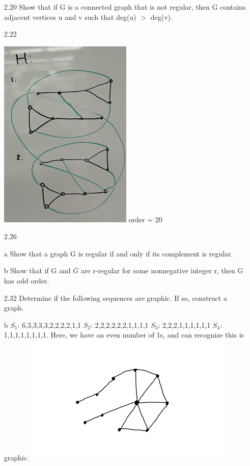 \documentclass[12pt]{article}
\begin{document}
\begin{enumerate}
\item[2.20]  Show that if G is a connected graph that is not regular, then G contains adjacent vertices
 u and v such that deg(u) $>$ deg(v).

    
\item[2.22] 
\begin{center}
    \includegraphics[width=0.5\textwidth]{IMG_1782.jpg}
    order = 20
\end{center}

\item[2.26] 
\item[a] Show that a graph G is regular if and only if its complement is regular.


\item[b] Show that if G and $\overline{G}$ are r-regular for some nonnegative integer r, then G has odd order.


\item[2.32] Determine if the following sequences are graphic. If so, construct a graph.
\item[b] 
    \newline
    $S_1$: 6,3,3,3,3,2,2,2,2,1,1
    \newline
    $S_2$: 2,2,2,2,2,2,1,1,1,1
    \newline
    $S_3$: 2,2,2,1,1,1,1,1,1
    \newline
    $S_4$: 1,1,1,1,1,1,1,1. Here, we have an even number of 1s, and can recognize this is graphic.
    \newline
    \includegraphics{grapha.png}



\end{enumerate}
\end{document}
